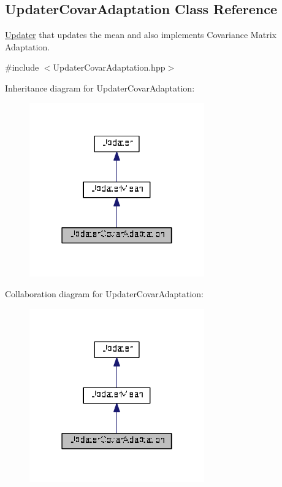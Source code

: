 \hypertarget{classDmpBbo_1_1UpdaterCovarAdaptation}{\subsection{Updater\+Covar\+Adaptation Class Reference}
\label{classDmpBbo_1_1UpdaterCovarAdaptation}
}


\hyperlink{classDmpBbo_1_1Updater}{Updater} that updates the mean and also implements Covariance Matrix Adaptation.  




{\ttfamily \#include $<$Updater\+Covar\+Adaptation.\+hpp$>$}



Inheritance diagram for Updater\+Covar\+Adaptation\+:
\nopagebreak
\begin{figure}[H]
\begin{center}
\leavevmode
\includegraphics[width=214pt]{classDmpBbo_1_1UpdaterCovarAdaptation__inherit__graph}
\end{center}
\end{figure}


Collaboration diagram for Updater\+Covar\+Adaptation\+:
\nopagebreak
\begin{figure}[H]
\begin{center}
\leavevmode
\includegraphics[width=214pt]{classDmpBbo_1_1UpdaterCovarAdaptation__coll__graph}
\end{center}
\end{figure}

